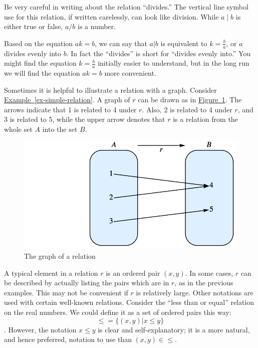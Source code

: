 \documentclass[10pt,]{book}
\theoremstyle{plain}
\theoremstyle{definition}
\theoremstyle{definition}
\theoremstyle{definition}
\theoremstyle{definition}
\begin{document}
\par
Be very careful in writing about the relation ``divides.''  The vertical line symbol use for this relation, if written carelessly, can look like division.  While \(a \mid b\) is either true or false, \(a/b\) is a number. %
\par
Based on the equation \(a k = b\), we can say that \(a|b\) is equivalent to \(k= \frac{b}{a}\), or \(a\) divides evenly into \(b\). In fact the ``divides'' is short for ``divides evenly into.'' You might find the equation \(k= \frac{b}{a}\) initially easier to understand, but in the long run we will find the equation \(a k = b\) more convenient. %
\par
Sometimes it is helpful to illustrate a relation with a graph. Consider \hyperref[ex-simple-relation]{Example~\ref{ex-simple-relation}}.  A graph of \(r\) can be drawn as in \hyperref[graph-6-1-1-relation]{Figure~\ref{graph-6-1-1-relation}}. The arrows indicate that 1 is related to 4 under \(r\). Also, 2 is related to 4 under \(r\), and 3 is related to 5, while the upper arrow denotes that \(r\) is a relation from the whole set \(A\) into the set \(B\). %
\leavevmode%
\begin{figure}
\centering
\includegraphics[width=1\linewidth]{images/graph-6-1-relation-graph.png}
\caption{The graph of a relation\label{graph-6-1-1-relation}}
\end{figure}
\par
A typical element in a relation \(r\) is an ordered pair \((x, y)\). In some cases, \(r\) can be described by actually listing the pairs which are in \(r\), as in the previous examples. This may not be convenient if \(r\) is relatively large. Other notations are used with certain well-known relations. Consider the ``less than or equal'' relation on the real numbers. We could define it as a set of ordered pairs this way:
\[\le = \{(x, y) | x \leq  y\}\].
However, the notation \(x \leq  y\) is clear and self-explanatory; it is a more natural, and hence preferred, notation to use than \((x, y) \in \le\).%
\end{document}
